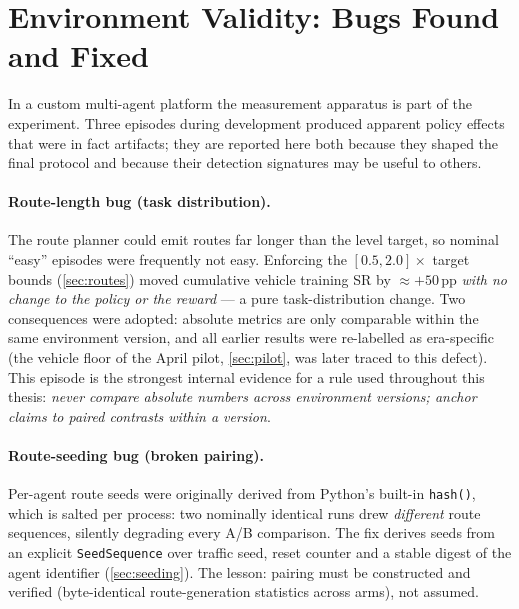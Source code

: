 \section{Environment Validity: Bugs Found and Fixed}
\label{sec:bugs}

In a custom multi-agent platform the measurement apparatus is part of the
experiment. Three episodes during development produced apparent policy
effects that were in fact artifacts; they are reported here both because
they shaped the final protocol and because their detection signatures may
be useful to others.

\paragraph{Route-length bug (task distribution).}
The route planner could emit routes far longer than the level target, so
nominal ``easy'' episodes were frequently not easy. Enforcing the
$[0.5, 2.0]\times$ target bounds (\cref{sec:routes}) moved cumulative
vehicle training SR by $\approx +50$\,pp \emph{with no change to the
policy or the reward} --- a pure task-distribution change. Two
consequences were adopted: absolute metrics are only comparable within the
same environment version, and all earlier results were re-labelled as
era-specific (the vehicle floor of the April pilot,
\cref{sec:pilot}, was later traced to this defect). This episode is the
strongest internal evidence for a rule used throughout this thesis:
\emph{never compare absolute numbers across environment versions; anchor
claims to paired contrasts within a version}.

\paragraph{Route-seeding bug (broken pairing).}
Per-agent route seeds were originally derived from Python's built-in
\texttt{hash()}, which is salted per process: two nominally identical runs
drew \emph{different} route sequences, silently degrading every A/B
comparison. The fix derives seeds from an explicit
\texttt{SeedSequence} over traffic seed, reset counter and a stable digest
of the agent identifier (\cref{sec:seeding}). The lesson: pairing must be
constructed and verified (byte-identical route-generation statistics
across arms), not assumed.

